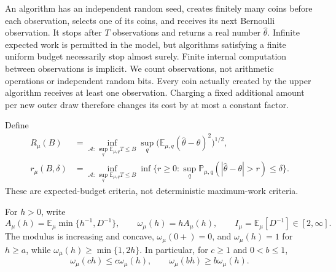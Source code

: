 \documentclass[11pt,a4paper]{article}
\theoremstyle{definition}
\newcommand{\E}{\mathbb E}
\newcommand{\Prob}{\mathbb P}
\newcommand{\cA}{\mathcal A}
\newcommand{\om}{\omega_\mu}
\newcommand{\Am}{A_\mu}
\newcommand{\Iinv}{I_\mu}
\begin{document}
An algorithm has an independent random seed, creates finitely many coins
before each observation, selects one of its coins, and receives its next
Bernoulli observation. It stops after $T$ observations and returns a real
number $\widehat\theta$. Infinite expected work is permitted in the model,
but algorithms satisfying a finite uniform budget necessarily stop almost
surely. Finite internal computation between observations is implicit.
We count observations, not arithmetic operations or independent random bits.
Every coin actually created by the upper algorithm receives at least one
observation. Charging a fixed additional amount per new outer draw therefore
changes its cost by at most a constant factor.

Define
\begin{align}
 R_\mu(B)&=\inf_{\cA:\,\sup_q\E_{\mu,q}T\le B}
       \sup_q\bigl(\E_{\mu,q}(\widehat\theta-\theta)^2\bigr)^{1/2},
       \label{eq:risk}\\
 r_\mu(B,\delta)&=\inf_{\cA:\,\sup_q\E_{\mu,q}T\le B}
   \inf\{r\ge0:\sup_q\Prob_{\mu,q}(|\widehat\theta-\theta|>r)\le\delta\}.
       \label{eq:confidence-risk}
\end{align}
These are expected-budget criteria, not deterministic maximum-work criteria.

For $h>0$, write
\begin{equation}\label{eq:A-I}
 \Am(h)=\E_\mu\min\{h^{-1},D^{-1}\},\qquad
 \om(h)=h\Am(h),\qquad \Iinv=\E_\mu[D^{-1}]\in[2,\infty].
\end{equation}
The modulus is increasing and concave, $\om(0+)=0$, and $\om(h)=1$ for
$h\ge a$, while $\om(h)\ge\min\{1,2h\}$. In particular, for $c\ge1$ and $0<b\le1$,
\begin{equation}\label{eq:scaling}
 \om(ch)\le c\om(h),\qquad \om(bh)\ge b\om(h).
\end{equation}
\end{document}
